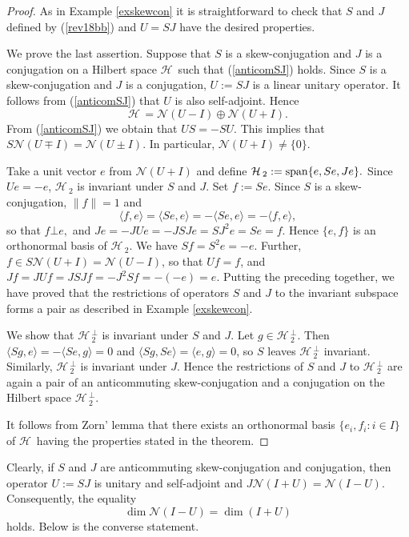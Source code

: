 \documentclass[12pt]{amsart}
\theoremstyle{definition}
\newcommand{\cH}{\mathcal{H}\,}
\newcommand{\cN}{\mathcal{N}}
\begin{document}
\begin{proof}
As in Example  \ref{exskewcon} it is straightforward to check that $S$ and $J$ defined by (\ref{rev18bb}) and $U=SJ$ have the desired properties.

We prove the last assertion.  Suppose that $S$ is a skew-conjugation and $J$ is a conjugation on a Hilbert space  $\cH$ such that (\ref{anticomSJ}) holds. Since $S$ is a skew-conjugation and $J$ is a conjugation,  $U:=SJ$ is a linear unitary operator. It follows from  (\ref{anticomSJ}) that $U$ is also self-adjoint. Hence $$\cH=\cN(U-I)\oplus \cN(U+I).$$
From  (\ref{anticomSJ}) we obtain that $US=-SU$. This implies that $S\cN(U\mp I)=\cN(U\pm I)$. In particular, $\cN(U+I)\neq \{0\}$.

Take a unit vector $e$ from $\cN(U+I)$ and define $\cH_2:={\rm span} \{e, Se, Je\}.$ Since $Ue=-e$, $\cH_2$ is invariant under $S$ and $J$. Set $f:=Se$.  Since $S$ is a skew-conjugation, $\|f\|=1$ and $$\langle f,e\rangle =\langle Se,e\rangle =-\langle Se,e\rangle=-\langle f,e\rangle ,$$ so that $f\bot e,$ and $Je=-JUe=-JSJe=SJ^2e=Se=f$. Hence $\{e,f\}$ is an orthonormal basis of $\cH_2$. We have $Sf=S^2e=-e$. Further, $f\in S\cN(U+I)=\cN(U-I)$, so that $Uf=f$, and $Jf=JUf=JSJf=-J^2Sf=-(-e)=e$.
Putting the preceding together, we have proved that the restrictions of operators $S$ and $J$ to the invariant subspace forms a pair as described in Example \ref{exskewcon}.

We show that $\cH_2^\bot$ is invariant under $S$ and $J$. Let $g\in \cH_2^\bot$. Then $\langle Sg, e\rangle=-\langle Se,g\rangle=0$ and $\langle Sg,Se\rangle=\langle e,g\rangle=0$, so $S$ leaves $\cH_2^\bot$ invariant. Similarly, $\cH_2^\bot$ is invariant under $J$. Hence the restrictions of $S$ and $J$ to $\cH_2^\bot$ are again a pair of an anticommuting skew-conjugation and a conjugation on the Hilbert space $\cH_2^\bot.$

It follows from Zorn' lemma  that there exists an orthonormal basis $\{e_i,f_i:i\in I\}$  of $\cH$ having the properties stated in the theorem.
\end{proof}
Clearly, if $S$ and $J$  are anticommuting skew-conjugation and conjugation, then operator $U:=SJ$ is unitary and self-adjoint and $J\cN(I+U)=\cN(I-U)$. Consequently, the equality
\begin{equation}\label{rev27ab}
\dim\cN(I-U)=\dim (I+U)
\end{equation}
holds. Below is the converse statement.
\end{document}
